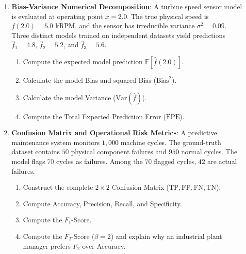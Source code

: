 \begin{checkyourself}
\begin{enumerate}
    \item \textbf{Bias-Variance Numerical Decomposition}:
    A turbine speed sensor model is evaluated at operating point $x = 2.0$. The true physical speed is $f(2.0) = 5.0\text{ kRPM}$, and the sensor has irreducible variance $\sigma^2 = 0.09$. Three distinct models trained on independent datasets yield predictions $\hat{f}_1 = 4.8$, $\hat{f}_2 = 5.2$, and $\hat{f}_3 = 5.6$.
    \begin{enumerate}[label=(\alph*)]
        \item Compute the expected model prediction $\mathbb{E}[\hat{f}(2.0)]$.
        \item Calculate the model Bias and squared Bias ($\text{Bias}^2$).
        \item Calculate the model Variance ($\text{Var}(\hat{f})$).
        \item Compute the Total Expected Prediction Error ($\text{EPE}$).
    \end{enumerate}

    \item \textbf{Confusion Matrix and Operational Risk Metrics}:
    A predictive maintenance system monitors $1{,}000$ machine cycles. The ground-truth dataset contains $50$ physical component failures and $950$ normal cycles. The model flags $70$ cycles as failures. Among the $70$ flagged cycles, $42$ are actual failures.
    \begin{enumerate}[label=(\alph*)]
        \item Construct the complete $2 \times 2$ Confusion Matrix ($\text{TP}, \text{FP}, \text{FN}, \text{TN}$).
        \item Compute Accuracy, Precision, Recall, and Specificity.
        \item Compute the $F_1$-Score.
        \item Compute the $F_2$-Score ($\beta = 2$) and explain why an industrial plant manager prefers $F_2$ over Accuracy.
    \end{enumerate}


\end{enumerate}
\end{checkyourself}
